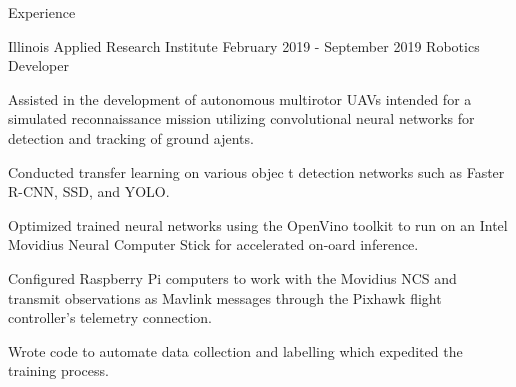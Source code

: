 \documentclass{resume} %
\begin{document}

\begin{rSection}{Experience}

    \begin{rSubsection}{Illinois Applied Research Institute} {February 2019 - September 2019} {Robotics Developer}

        \item Assisted in the development of autonomous multirotor UAVs intended for a simulated reconnaissance mission utilizing convolutional neural networks for detection and tracking of ground ajents.
        \item Conducted transfer learning on various objec
        t detection networks such as Faster R-CNN, SSD, and YOLO.
        \item Optimized trained neural networks using the OpenVino toolkit to run on an Intel Movidius Neural Computer Stick for accelerated on-oard inference.
        \item Configured Raspberry Pi computers to work with the Movidius NCS and transmit observations as Mavlink messages through the Pixhawk flight controller's telemetry connection.
        \item Wrote code to automate data collection and labelling which expedited the training process.

    \end{rSubsection}

\end{rSection}

\end{document}

